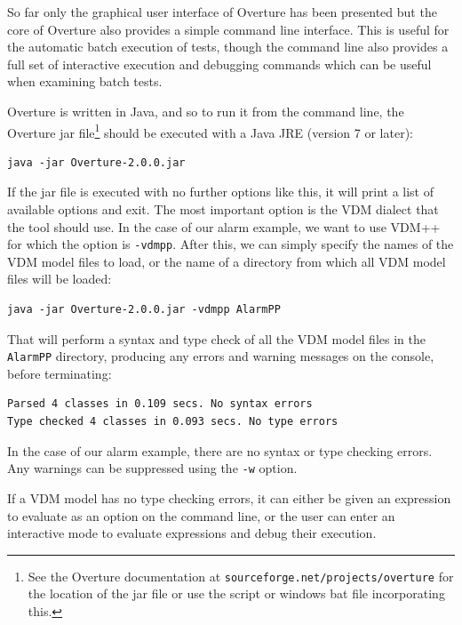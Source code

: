 So far only the graphical user interface of Overture has been
presented but the core of Overture also
provides a simple command line interface.  This is useful for the
automatic batch execution of tests, though the command line also
provides a full set of interactive execution and debugging commands
which can be useful when examining batch tests. 

Overture is written in Java, and so to run it from the command line, the
Overture jar file\footnote{See the Overture documentation at
  \texttt{sourceforge.net/projects/overture} for the location of the
  jar file or use the script or windows bat file incorporating this.}  
should be executed with a Java JRE (version 7 or later):

\lstset{style=tool,language=}
\begin{lstlisting}
java -jar Overture-2.0.0.jar
\end{lstlisting}

\noindent If the jar file is executed with no further options like this, it will
print a list of available options and exit. The most important option is the VDM
dialect that the tool should use. In the case of our alarm example, we want to
use VDM++ for which the option is \verb|-vdmpp|. After this, we can simply
specify the names of the VDM model files to load, or the name of a
directory from which all VDM model files will be loaded:

\begin{lstlisting}
java -jar Overture-2.0.0.jar -vdmpp AlarmPP
\end{lstlisting}

\noindent That will perform a syntax and type check of all the
VDM model files in the \verb|AlarmPP| directory, producing any
errors and warning messages on the console, before terminating:

\begin{lstlisting}
Parsed 4 classes in 0.109 secs. No syntax errors
Type checked 4 classes in 0.093 secs. No type errors
\end{lstlisting}

\noindent In the case of our alarm example, there are no syntax or
type checking errors. Any warnings can be suppressed using the
\verb|-w| option.

If a VDM model has no type checking errors, it can either be given
an expression to evaluate as an option on the command line, or the
user can enter an interactive mode to evaluate expressions and debug
their execution.

